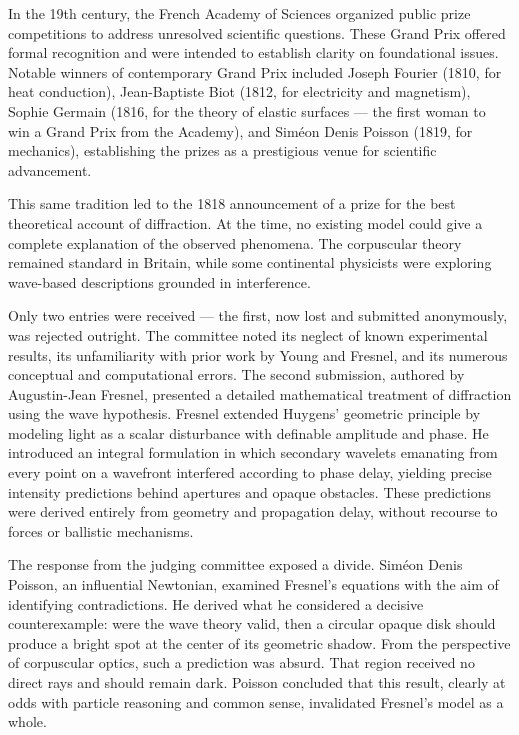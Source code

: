 In the 19th century, the French Academy of Sciences organized public prize competitions to address unresolved scientific questions. These Grand Prix offered formal recognition and were intended to establish clarity on foundational issues. Notable winners of contemporary Grand Prix included Joseph Fourier (1810, for heat conduction), Jean-Baptiste Biot (1812, for electricity and magnetism), Sophie Germain (1816, for the theory of elastic surfaces — the first woman to win a Grand Prix from the Academy), and Siméon Denis Poisson (1819, for mechanics), establishing the prizes as a prestigious venue for scientific advancement.

This same tradition led to the 1818 announcement of a prize for the best theoretical account of diffraction. At the time, no existing model could give a complete explanation of the observed phenomena. The corpuscular theory remained standard in Britain, while some continental physicists were exploring wave-based descriptions grounded in interference.

Only two entries were received — the first, now lost and submitted anonymously, was rejected outright. The committee noted its neglect of known experimental results, its unfamiliarity with prior work by Young and Fresnel, and its numerous conceptual and computational errors. The second submission, authored by Augustin-Jean Fresnel, presented a detailed mathematical treatment of diffraction using the wave hypothesis. Fresnel extended Huygens' geometric principle by modeling light as a scalar disturbance with definable amplitude and phase. He introduced an integral formulation in which secondary wavelets emanating from every point on a wavefront interfered according to phase delay, yielding precise intensity predictions behind apertures and opaque obstacles. These predictions were derived entirely from geometry and propagation delay, without recourse to forces or ballistic mechanisms.

The response from the judging committee exposed a divide. Siméon Denis Poisson, an influential Newtonian, examined Fresnel's equations with the aim of identifying contradictions. He derived what he considered a decisive counterexample: were the wave theory valid, then a circular opaque disk should produce a bright spot at the center of its geometric shadow. From the perspective of corpuscular optics, such a prediction was absurd. That region received no direct rays and should remain dark. Poisson concluded that this result, clearly at odds with particle reasoning and common sense, invalidated Fresnel's model as a whole.

